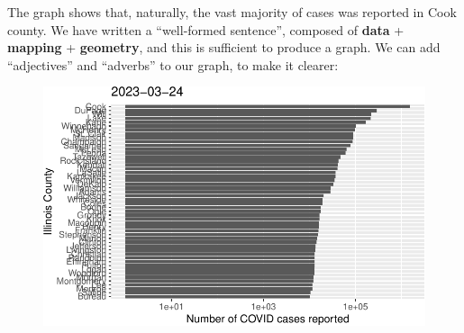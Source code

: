 \documentclass[
  letterpaper,
  DIV=11,
  numbers=noendperiod]{scrreprt}
\newenvironment{Shaded}{\begin{snugshade}}{\end{snugshade}}
\newcommand{\AttributeTok}[1]{\textcolor[rgb]{0.40,0.45,0.13}{#1}}
\newcommand{\CommentTok}[1]{\textcolor[rgb]{0.37,0.37,0.37}{#1}}
\newcommand{\DecValTok}[1]{\textcolor[rgb]{0.68,0.00,0.00}{#1}}
\newcommand{\FunctionTok}[1]{\textcolor[rgb]{0.28,0.35,0.67}{#1}}
\newcommand{\NormalTok}[1]{\textcolor[rgb]{0.00,0.23,0.31}{#1}}
\newcommand{\SpecialCharTok}[1]{\textcolor[rgb]{0.37,0.37,0.37}{#1}}
\newcommand{\StringTok}[1]{\textcolor[rgb]{0.13,0.47,0.30}{#1}}
\begin{document}
The graph shows that, naturally, the vast majority of cases was reported
in Cook county. We have written a ``well-formed sentence'', composed of
\textbf{data} + \textbf{mapping} + \textbf{geometry}, and this is
sufficient to produce a graph. We can add ``adjectives'' and ``adverbs''
to our graph, to make it clearer:

\begin{Shaded}
\end{Shaded}

\begin{figure}[H]

{\centering \includegraphics{./01-dataviz_files/figure-pdf/unnamed-chunk-8-1.pdf}

}

\end{figure}
\end{document}
